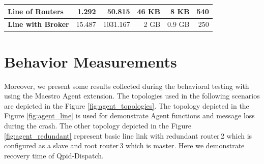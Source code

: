 \begin{table}[H]
\begin{tabular}{|l|r|r|r|r|r|}
	\textbf{Line of Routers}                                                           & \cellcolor[HTML]{9AFF99}1.292                               & 50.815                                                      & 46 KB                                                       & 8 KB                                                           & \cellcolor[HTML]{FFCCC9}540                                                                                                           \\ \hline
	\textbf{Line with Broker}                                                          & \cellcolor[HTML]{FFCCC9}15.487                              & 1031.167                                                    & 2 GB                                                        & 0.9 GB                                                         & \cellcolor[HTML]{9AFF99}250                                                                                                           \\ \hline
	\end{tabular}
	\end{table}
\endgroup

\newpage
\section{Behavior Measurements}
\label{Behavior Measurements}
Moreover, we present some results collected during the behavioral testing with using the Maestro Agent extension. The topologies used in the following scenarios are depicted in the Figure \ref{fig:agent_topologies}. The topology depicted in the Figure \ref{fig:agent_line} is used for demonstrate Agent functions and message loss during the crash. The other topology depicted in the Figure \ref{fig:agent_redundant} represent basic line link with redundant router\,2 which is configured as a slave and root router\,3 which is master. Here we demonstrate recovery time of Qpid-Dispatch.

